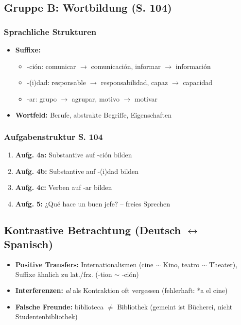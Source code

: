 \documentclass[11pt,a4paper]{article}
\begin{document}
\subsection{Gruppe B: Wortbildung (S. 104)}

\subsubsection{Sprachliche Strukturen}
\begin{itemize}
    \item \textbf{Suffixe:}
    \begin{itemize}
        \item -ción: comunicar $\rightarrow$ comunicación, informar $\rightarrow$ información
        \item -(i)dad: responsable $\rightarrow$ responsabilidad, capaz $\rightarrow$ capacidad
        \item -ar: grupo $\rightarrow$ agrupar, motivo $\rightarrow$ motivar
    \end{itemize}
    \item \textbf{Wortfeld:} Berufe, abstrakte Begriffe, Eigenschaften
\end{itemize}

\subsubsection{Aufgabenstruktur S. 104}
\begin{enumerate}
    \item \textbf{Aufg. 4a:} Substantive auf -ción bilden
    \item \textbf{Aufg. 4b:} Substantive auf -(i)dad bilden
    \item \textbf{Aufg. 4c:} Verben auf -ar bilden
    \item \textbf{Aufg. 5:} ¿Qué hace un buen jefe? -- freies Sprechen
\end{enumerate}

\subsection{Kontrastive Betrachtung (Deutsch $\leftrightarrow$ Spanisch)}
\begin{itemize}
    \item \textbf{Positive Transfers:} Internationalismen (cine $\sim$ Kino, teatro $\sim$ Theater), Suffixe ähnlich zu lat./frz. (-tion $\sim$ -ción)
    \item \textbf{Interferenzen:} \textit{al} als Kontraktion oft vergessen (fehlerhaft: *a el cine)
    \item \textbf{Falsche Freunde:} biblioteca $\neq$ Bibliothek (gemeint ist Bücherei, nicht Studentenbibliothek)
\end{itemize}
\end{document}
